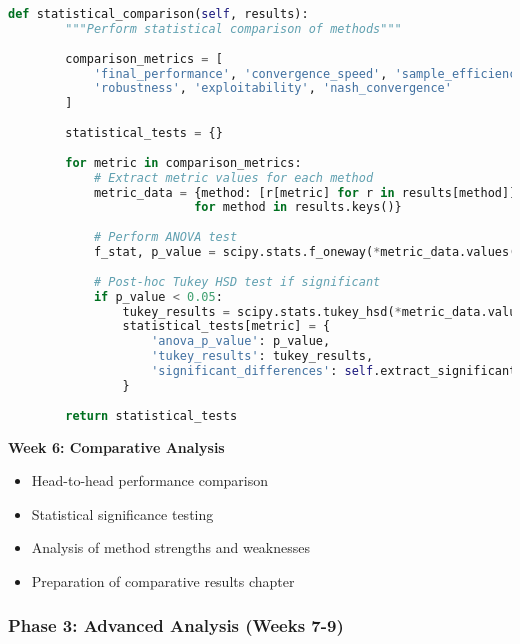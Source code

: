 \documentclass[12pt,a4paper]{article}
\begin{document}
\begin{lstlisting}[language=Python, caption=Baseline Methods Implementation]
    def statistical_comparison(self, results):
        """Perform statistical comparison of methods"""
        
        comparison_metrics = [
            'final_performance', 'convergence_speed', 'sample_efficiency',
            'robustness', 'exploitability', 'nash_convergence'
        ]
        
        statistical_tests = {}
        
        for metric in comparison_metrics:
            # Extract metric values for each method
            metric_data = {method: [r[metric] for r in results[method]] 
                          for method in results.keys()}
            
            # Perform ANOVA test
            f_stat, p_value = scipy.stats.f_oneway(*metric_data.values())
            
            # Post-hoc Tukey HSD test if significant
            if p_value < 0.05:
                tukey_results = scipy.stats.tukey_hsd(*metric_data.values())
                statistical_tests[metric] = {
                    'anova_p_value': p_value,
                    'tukey_results': tukey_results,
                    'significant_differences': self.extract_significant_pairs(tukey_results)
                }
        
        return statistical_tests
\end{lstlisting}

\textbf{Week 6: Comparative Analysis}
\begin{itemize}
    \item Head-to-head performance comparison
    \item Statistical significance testing
    \item Analysis of method strengths and weaknesses
    \item Preparation of comparative results chapter
\end{itemize}

\subsubsection{Phase 3: Advanced Analysis (Weeks 7-9)}
\end{document}
